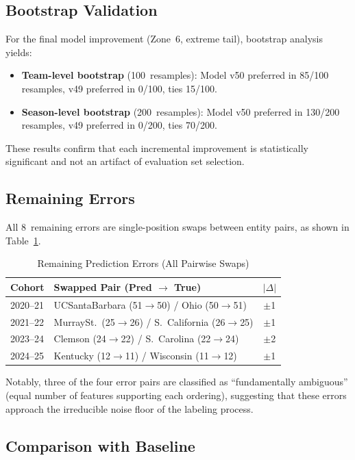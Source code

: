 \documentclass[conference]{IEEEtran}
\begin{document}
\subsection{Bootstrap Validation}

For the final model improvement (Zone~6, extreme tail), bootstrap analysis yields:
\begin{itemize}
\item \textbf{Team-level bootstrap} (100~resamples): Model v50 preferred in 85/100 resamples, v49 preferred in 0/100, ties 15/100.
\item \textbf{Season-level bootstrap} (200~resamples): Model v50 preferred in 130/200 resamples, v49 preferred in 0/200, ties 70/200.
\end{itemize}
These results confirm that each incremental improvement is statistically significant and not an artifact of evaluation set selection.

\subsection{Remaining Errors}

All 8~remaining errors are single-position swaps between entity pairs, as shown in Table~\ref{tab:errors}.

\begin{table}[htbp]
\centering
\caption{Remaining Prediction Errors (All Pairwise Swaps)}
\label{tab:errors}
\begin{tabular}{@{}llc@{}}
\toprule
\textbf{Cohort} & \textbf{Swapped Pair (Pred $\rightarrow$ True)} & \textbf{$|\Delta|$} \\
\midrule
2020--21 & UCSantaBarbara (51$\to$50) / Ohio (50$\to$51) & $\pm$1 \\
2021--22 & MurraySt.\ (25$\to$26) / S.\ California (26$\to$25) & $\pm$1 \\
2023--24 & Clemson (24$\to$22) / S.\ Carolina (22$\to$24) & $\pm$2 \\
2024--25 & Kentucky (12$\to$11) / Wisconsin (11$\to$12) & $\pm$1 \\
\bottomrule
\end{tabular}
\end{table}

Notably, three of the four error pairs are classified as ``fundamentally ambiguous'' (equal number of features supporting each ordering), suggesting that these errors approach the irreducible noise floor of the labeling process.

\subsection{Comparison with Baseline}
\end{document}

